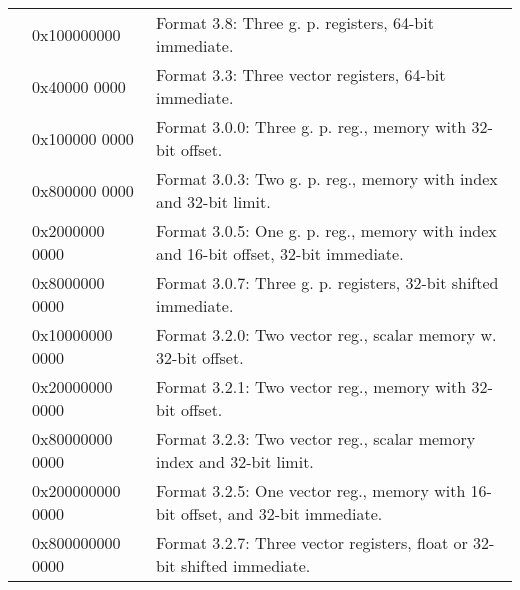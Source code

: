 \documentclass[forwardcom.tex]{subfiles}
\begin{document}
\begin{longtable} {|p{18mm}|p{20mm} p{80mm}|}
  & 0x100000000 & Format 3.8:   Three g. p. registers, 64-bit immediate. \\
  & 0x40000 0000 & Format 3.3:   Three vector registers, 64-bit immediate. \\
 
  &  0x100000 0000 & Format 3.0.0: Three g. p. reg., memory with 32-bit offset. \\
  &  0x800000 0000 & Format 3.0.3: Two g. p. reg., memory with index and 32-bit limit.\\  
  &  0x2000000 0000 & Format 3.0.5: One g. p. reg., memory with index and 16-bit offset, 32-bit immediate.\\  
  &  0x8000000 0000 & Format 3.0.7: Three g. p. registers, 32-bit shifted immediate. \\  

  &  0x10000000 0000 & Format 3.2.0: Two vector reg., scalar memory w. 32-bit offset. \\
  &  0x20000000 0000 & Format 3.2.1: Two vector reg., memory with 32-bit offset. \\
  &  0x80000000 0000 & Format 3.2.3: Two vector reg., scalar memory index and 32-bit limit. \\
  &  0x200000000 0000 & Format 3.2.5: One vector reg., memory with 16-bit offset, and 32-bit immediate. \\
  &  0x800000000 0000 & Format 3.2.7: Three vector registers, float or 32-bit shifted immediate.\\

\hline


\end{longtable}
\end{document}
